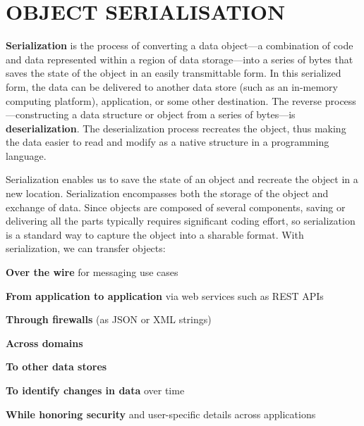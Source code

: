 \documentclass[../report.tex]{subfiles}
\begin{document}
\section{OBJECT SERIALISATION} %

\textbf{Serialization} is the process of converting a data object—a combination of code and data represented within a region of data storage—into a series of bytes that saves the state of the object in an easily transmittable form. In this serialized form, the data can be delivered to another data store (such as an in-memory computing platform), application, or some other destination. The reverse process—constructing a data structure or object from a series of bytes—is \textbf{deserialization}. The deserialization process recreates the object, thus making the data easier to read and modify as a native structure in a programming language.

Serialization enables us to save the state of an object and recreate the object in a new location. Serialization encompasses both the storage of the object and exchange of data. Since objects are composed of several components, saving or delivering all the parts typically requires significant coding effort, so serialization is a standard way to capture the object into a sharable format. With serialization, we can transfer objects:

\textbf{Over the wire} for messaging use cases

\textbf{From application to application} via web services such as REST APIs

\textbf{Through firewalls} (as JSON or XML strings)

\textbf{Across domains}

\textbf{To other data stores}

\textbf{To identify changes in data} over time

\textbf{While honoring security} and user-specific details across applications
\end{document}
